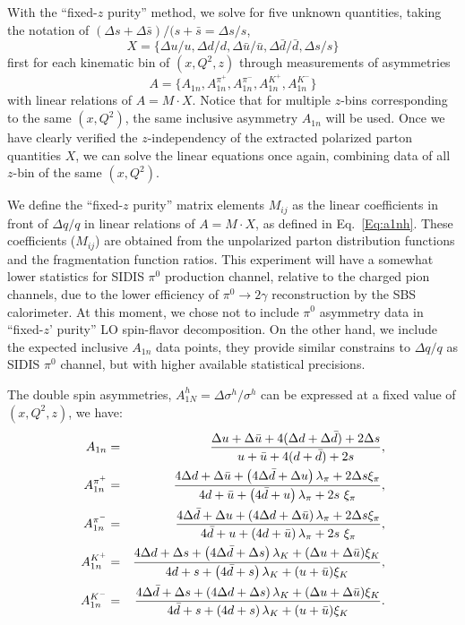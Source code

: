 With the ``fixed-$z$ purity'' method,  we solve for five unknown quantities, taking the notation of $(\Delta s +\Delta \bar{s})/(s+\bar{s}= \Delta s/s$,
 $$X=\{\Delta u/u, \Delta d/d, \Delta \bar{u}/\bar{u},
 \Delta \bar{d}/\bar{d},   \Delta s/s\}$$ first for each kinematic bin of $(x, Q^2,z)$  through measurements of asymmetries $$A=\{ A_{1n}, A_{1n}^{\pi^+}, A_{1n}^{\pi^-},A_{1n}^{K^+},A_{1n}^{K^-} \}$$ with  linear relations  of $A=M\cdot X$.  Notice that for multiple $z$-bins corresponding to the same $(x,Q^2)$, the same inclusive asymmetry $A_{1n}$ will be used.  Once we have clearly verified the $z$-independency of  the extracted polarized parton quantities $X$, we can solve the linear equations once again, combining data of all $z$-bin of the same  $(x,Q^2)$.

We define the ``fixed-$z$ purity'' matrix elements $M_{ij}$ as  the linear coefficients 
in front of $\Delta q/q$ in linear relations of $A=M\cdot X$, as defined in Eq.~\ref{Eq:a1nh}. These coefficients ($M_{ij}$) are obtained from the
unpolarized parton distribution functions and the fragmentation function ratios.   This experiment will have a somewhat lower statistics for SIDIS $\pi^0$ production channel, relative to the charged pion channels, due to the lower efficiency of $\pi^0 \rightarrow 2 \gamma$  reconstruction by the SBS calorimeter.   At this moment, we chose not to include $\pi^0$  asymmetry data in ``fixed-$z$' purity'' LO spin-flavor decomposition.   On the other hand, we include the expected inclusive $A_{1n}$ data points,  they provide similar constrains to $\Delta q/q$ as SIDIS $\pi^0$ channel, but with higher available statistical precisions.  

The  double spin asymmetries, $A_{1N}^h=\Delta \sigma^h/\sigma^h$ can be expressed
at a fixed value of $(x, Q^2, z)$,  we have: 
\begin{eqnarray}
\label{Eq:a1nh}
A_{1n} & = & 
{  \Delta u+ \Delta {\bar u} + 4 ( \Delta d + \Delta \bar{d} ) + 2 \Delta s 
\over u  + {\bar u} + 4(d+\bar{d} )+ 2s },  \nonumber  \\
A_{1n}^{\pi^+} & = & 
{  4\Delta d+ \Delta {\bar u} + \left( 4\Delta {\bar d} + \Delta u \right) 
 \lambda_{\pi} + 2 \Delta s  \xi_{\pi}
\over 4d  + {\bar u} + \left(4{\bar d} + u \right)  \lambda_{\pi} + 
2 s \ \xi_{\pi}},  \nonumber  \\
A_{1n}^{\pi^-} & = & 
{  4\Delta \bar{d}+ \Delta u + \left( 4\Delta d + \Delta \bar{u} \right) 
 \lambda_{\pi} + 2 \Delta s  \xi_{\pi}
\over 4\bar{d}  + u + \left(4 d + \bar{u} \right)  \lambda_{\pi} + 
2 s \ \xi_{\pi}},  \nonumber  \\
A_{1n}^{K^+} & = & 
{  4\Delta d+ \Delta s + \left( 4\Delta {\bar d} + \Delta s \right) 
 \lambda_{K} + (\Delta u+\Delta \bar{u})  \xi_{K}
\over 4d  + s + \left(4{\bar d} + s \right)  \lambda_{K} + 
(u+\bar{u})  \xi_{K}}, \nonumber  \\
A_{1n}^{K^-} & = & 
{  4\Delta \bar{d}+ \Delta s + \left( 4\Delta  d + \Delta s \right) 
 \lambda_{K} + (\Delta u+\Delta \bar{u})  \xi_{K}
\over 4\bar{d}  + s + \left(4d + s \right)  \lambda_{K} + 
(u+\bar{u})  \xi_{K}}. 
\end{eqnarray}

